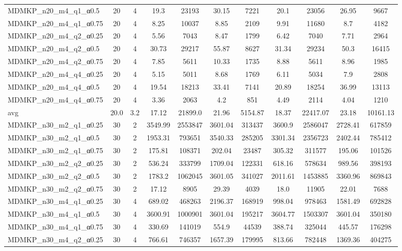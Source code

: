 \begin{table}[!ht]
\begin{tabular}{lcccccccccc}
MDMKP\_n20\_m4\_q1\_α0.5 & 20 & 4 & 19.3 & 23193 & 30.15 & 7221 & 20.1 & 23056 & 26.95 & 9667 \\
MDMKP\_n20\_m4\_q1\_α0.75 & 20 & 4 & 8.25 & 10037 & 8.85 & 2109 & 9.91 & 11680 & 8.7 & 4182 \\
MDMKP\_n20\_m4\_q2\_α0.25 & 20 & 4 & 5.56 & 7043 & 8.47 & 1799 & 6.42 & 7040 & 7.71 & 2964 \\
MDMKP\_n20\_m4\_q2\_α0.5 & 20 & 4 & 30.73 & 29217 & 55.87 & 8627 & 31.34 & 29234 & 50.3 & 16415 \\
MDMKP\_n20\_m4\_q2\_α0.75 & 20 & 4 & 7.85 & 5611 & 10.33 & 1735 & 8.88 & 5611 & 8.96 & 1985 \\
MDMKP\_n20\_m4\_q4\_α0.25 & 20 & 4 & 5.15 & 5011 & 8.68 & 1769 & 6.11 & 5034 & 7.9 & 2808 \\
MDMKP\_n20\_m4\_q4\_α0.5 & 20 & 4 & 19.54 & 18213 & 33.41 & 7141 & 20.89 & 18254 & 36.99 & 13113 \\
MDMKP\_n20\_m4\_q4\_α0.75 & 20 & 4 & 3.36 & 2063 & 4.2 & 851 & 4.49 & 2114 & 4.04 & 1210 \\
\hline avg & 20.0 & 3.2 & 17.12& 21899.0 & 21.96& 5154.87 & 18.37& 22417.07 & 23.18& 10161.13\\ \hline
MDMKP\_n30\_m2\_q1\_α0.25 & 30 & 2 & 3549.99 & 2553847 & 3601.04 & 313437 & 3600.9 & 2586047 & 2728.41 & 617859 \\
MDMKP\_n30\_m2\_q1\_α0.5 & 30 & 2 & 1953.31 & 793651 & 3540.33 & 285205 & 3301.34 & 2356723 & 2402.44 & 785412 \\
MDMKP\_n30\_m2\_q1\_α0.75 & 30 & 2 & 175.81 & 108371 & 202.04 & 23487 & 305.32 & 311577 & 195.06 & 101526 \\
MDMKP\_n30\_m2\_q2\_α0.25 & 30 & 2 & 536.24 & 333799 & 1709.04 & 122331 & 618.16 & 578634 & 989.56 & 398193 \\
MDMKP\_n30\_m2\_q2\_α0.5 & 30 & 2 & 1783.2 & 1062045 & 3601.05 & 341027 & 2011.61 & 1453885 & 3360.96 & 869843 \\
MDMKP\_n30\_m2\_q2\_α0.75 & 30 & 2 & 17.12 & 8905 & 29.39 & 4039 & 18.0 & 11905 & 22.01 & 7688 \\
MDMKP\_n30\_m4\_q1\_α0.25 & 30 & 4 & 689.02 & 468263 & 2196.37 & 168919 & 998.04 & 978463 & 1581.49 & 692828 \\
MDMKP\_n30\_m4\_q1\_α0.5 & 30 & 4 & 3600.91 & 1000901 & 3601.04 & 195217 & 3604.77 & 1503307 & 3601.04 & 350180 \\
MDMKP\_n30\_m4\_q1\_α0.75 & 30 & 4 & 330.69 & 141019 & 554.9 & 44539 & 388.74 & 325044 & 445.57 & 176298 \\
MDMKP\_n30\_m4\_q2\_α0.25 & 30 & 4 & 766.61 & 746357 & 1657.39 & 179995 & 813.66 & 782448 & 1369.36 & 404275 \\

\end{tabular}
\end{table}
